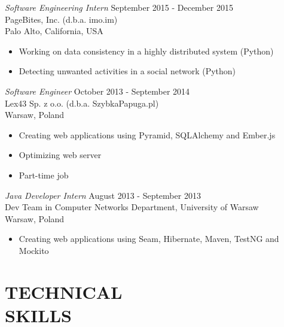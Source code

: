 \documentclass[margin, 10pt]{res} %
\begin{document}
\begin{resume}
{\sl Software Engineering Intern} \hfill September 2015 - December 2015 \\
PageBites, Inc. (d.b.a. imo.im) \\
Palo Alto, California, USA

\begin{itemize} \itemsep -2pt %
\item Working on data consistency in a highly distributed system (Python)
\item Detecting unwanted activities in a social network (Python)
\end{itemize}


{\sl Software Engineer} \hfill October 2013 - September 2014 \\
Lex43 Sp. z o.o. (d.b.a. SzybkaPapuga.pl) \\
Warsaw, Poland

\begin{itemize} \itemsep -2pt %
\item Creating web applications using Pyramid, SQLAlchemy and Ember.js
\item Optimizing web server
\item Part-time job
\end{itemize}
 
{\sl Java Developer Intern } \hfill August 2013 - September 2013 \\
Dev Team in Computer Networks Department, University of Warsaw \\
Warsaw, Poland
\begin{itemize} 
\item Creating web applications using Seam, Hibernate, Maven, TestNG and Mockito
\end{itemize}


\section{TECHNICAL \\ SKILLS} 


\end{resume}
\end{document}
